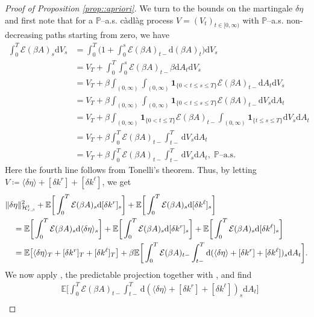 \documentclass[10pt]{article} %
\newcommand\cE{\mathcal E}
\newcommand\cH{\mathcal H}
\newcommand{\smalltext}[1]{\text{\fontsize{4}{4}\selectfont$#1$}}
\def \E{\mathbb{E}}
\def \P{\mathbb{P}}
\newcommand{\1}{\mathbf{1}}
\def\d{\mathrm{d}}
\begin{document}
\begin{proof}[Proof of Proposition \ref{prop::apriori}]
\medskip
We turn to the bounds on the martingale $\delta\eta$ and first note that for a $\P$--a.s. c\`adl\`ag process $V = (V_t)_{t \in [0,\infty)}$ with $\P$--a.s. non-decreasing paths starting from zero, we have
\begin{align}\label{eq::weighted_norm_V}
	\int_0^T \cE(\beta A)_s \d V_s 
	&= \int_0^T \bigg(1+\int_0^s \cE(\beta A)_{t-}\d(\beta A)_t\bigg) \d V_s \nonumber\\
	&= V_T + \int_0^T \int_0^s \cE(\beta A)_{t-}\beta\d A_t \d V_s \nonumber\\
	&= V_T + \beta \int_{(0,\infty)} \int_{(0,\infty)} \mathbf{1}_{\{0<t\leq s \leq T\}} \cE(\beta A)_{t-} \d A_t \d V_s \nonumber\\
	&= V_T + \beta \int_{(0,\infty)} \int_{(0,\infty)} \mathbf{1}_{\{0<t\leq s \leq T\}} \cE(\beta A)_{t-} \d V_s\d A_t \nonumber\\
	&= V_T + \beta \int_{(0,\infty)} \mathbf{1}_{\{0<t\leq T\}} \cE(\beta A)_{t-} \int_{(0,\infty)} \mathbf{1}_{\{t\leq s \leq T\}} \d V_s\d A_t \nonumber\\
	&= V_T + \beta \int_0^T \cE(\beta A)_{t-} \int_{t-}^T \d V_s\d A_t \nonumber\\
	&= V_T + \beta \int_0^T \cE(\beta A)_{t-} \int_{t-}^T \d V_s\d A_t, \; \text{$\P$--a.s.}
\end{align}
Here the fourth line follows from Tonelli's theorem. Thus, by letting $V \coloneqq \langle\delta\eta\rangle + [\delta k^r] + [\delta k^\ell]$, we get
\begin{align}\label{eq::decompeta}
	&\|\delta\eta\|^2_{\cH^\smalltext{2}_{\smalltext{T}\smalltext{,}\smalltext{\beta}}} + \E\bigg[\int_0^T \cE(\beta A)_s \d [\delta k^r]_s\bigg] + \E\bigg[\int_0^T \cE(\beta A)_s \d [\delta k^\ell]_s\bigg] \nonumber\\
	&\quad= \E\bigg[\int_0^T \cE(\beta A)_s \d \langle\delta\eta \rangle_s\bigg] + \E\bigg[\int_0^T \cE(\beta A)_s \d [\delta k^r]_s\bigg] + \E\bigg[\int_0^T \cE(\beta A)_s \d [\delta k^\ell]_s\bigg] \nonumber\\
	&\quad= \E\big[ \langle \delta\eta \rangle_T + [\delta k^r]_T + [\delta k^\ell]_T \big] + \beta \E \bigg[ \int_0^T \cE(\beta A)_{t-} \int_{t-}^T \d (\langle \delta\eta \rangle + [\delta k^r] + [\delta k^\ell])_s \d A_t \bigg].
\end{align}
We now apply \cite[Theorem VI.57]{dellacherie1982probabilities}, the predictable projection together with , and find
\begin{align*}
	&\E \bigg[ \int_0^T \cE(\beta A)_{t-} \int_{t-}^T \d (\langle \delta\eta \rangle + [\delta k^r] + [\delta k^\ell])_s \d A_t \bigg] \\

\end{align*}
\end{proof}
\end{document}

